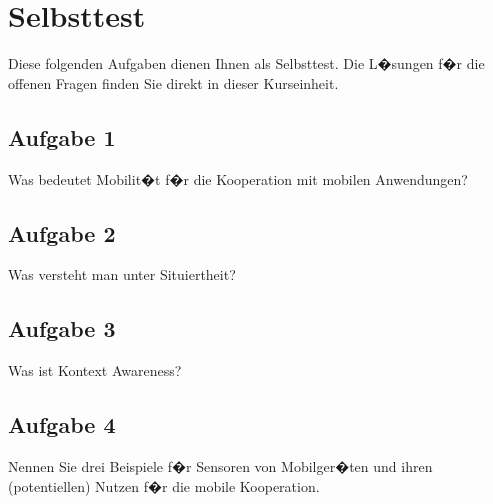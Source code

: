 %
%
%
%
%
%
%
%
%
%








\cleardoublepage
\section[Selbsttest]{Selbsttest\randnotiz{\quiz}}
Diese folgenden Aufgaben dienen Ihnen als Selbsttest. Die L�sungen f�r die offenen Fragen finden Sie direkt in dieser Kurseinheit.

\subsection*{Aufgabe 1} 
Was bedeutet Mobilit�t f�r die Kooperation mit mobilen Anwendungen?

\subsection*{Aufgabe 2} 
Was versteht man unter Situiertheit?

\subsection*{Aufgabe 3}
Was ist Kontext Awareness?

\subsection*{Aufgabe 4} 
Nennen Sie drei Beispiele f�r Sensoren von Mobilger�ten und ihren (potentiellen) Nutzen f�r die mobile Kooperation.

